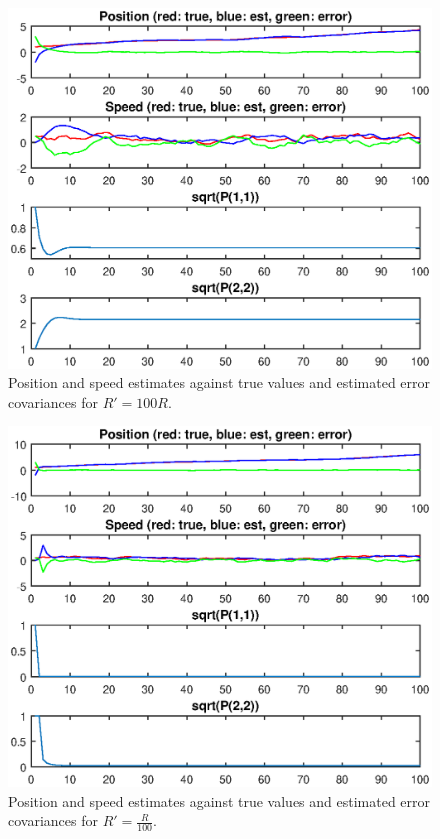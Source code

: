 \documentclass[12pt]{article}
\begin{document}
\begin{figure}[htbp]
 \centering
 \includegraphics[width=\textwidth]{q3_g}
 \caption{Position and speed estimates against true values and estimated error covariances for \(R'=100R\).}
 \label{fig:q3_g}
\end{figure}

\begin{figure}[htbp]
 \centering
 \includegraphics[width=\textwidth]{q3_l}
 \caption{Position and speed estimates against true values and estimated error covariances for \(R'=\frac{R}{100}\).}
 \label{fig:q3_l}
\end{figure}
\end{document}
